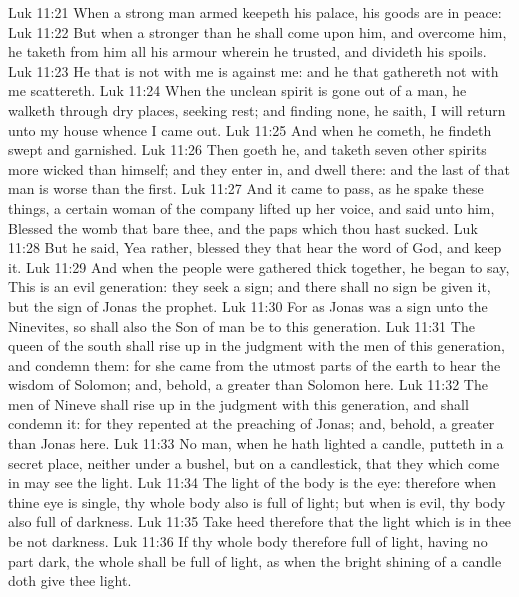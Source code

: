 \vs Luk 11:21 When a strong man armed keepeth his palace, his goods are in peace:
\vs Luk 11:22 But when a stronger than he shall come upon him, and overcome him, he taketh from him all his armour wherein he trusted, and divideth his spoils.
\vs Luk 11:23 He that is not with me is against me: and he that gathereth not with me scattereth.
\vs Luk 11:24 When the unclean spirit is gone out of a man, he walketh through dry places, seeking rest; and finding none, he saith, I will return unto my house whence I came out.
\vs Luk 11:25 And when he cometh, he findeth  swept and garnished.
\vs Luk 11:26 Then goeth he, and taketh  seven other spirits more wicked than himself; and they enter in, and dwell there: and the last  of that man is worse than the first.
\vs Luk 11:27 And it came to pass, as he spake these things, a certain woman of the company lifted up her voice, and said unto him, Blessed  the womb that bare thee, and the paps which thou hast sucked.
\vs Luk 11:28 But he said, Yea rather, blessed  they that hear the word of God, and keep it.
\vs Luk 11:29 And when the people were gathered thick together, he began to say, This is an evil generation: they seek a sign; and there shall no sign be given it, but the sign of Jonas the prophet.
\vs Luk 11:30 For as Jonas was a sign unto the Ninevites, so shall also the Son of man be to this generation.
\vs Luk 11:31 The queen of the south shall rise up in the judgment with the men of this generation, and condemn them: for she came from the utmost parts of the earth to hear the wisdom of Solomon; and, behold, a greater than Solomon  here.
\vs Luk 11:32 The men of Nineve shall rise up in the judgment with this generation, and shall condemn it: for they repented at the preaching of Jonas; and, behold, a greater than Jonas  here.
\vs Luk 11:33 No man, when he hath lighted a candle, putteth  in a secret place, neither under a bushel, but on a candlestick, that they which come in may see the light.
\vs Luk 11:34 The light of the body is the eye: therefore when thine eye is single, thy whole body also is full of light; but when  is evil, thy body also  full of darkness.
\vs Luk 11:35 Take heed therefore that the light which is in thee be not darkness.
\vs Luk 11:36 If thy whole body therefore  full of light, having no part dark, the whole shall be full of light, as when the bright shining of a candle doth give thee light.
